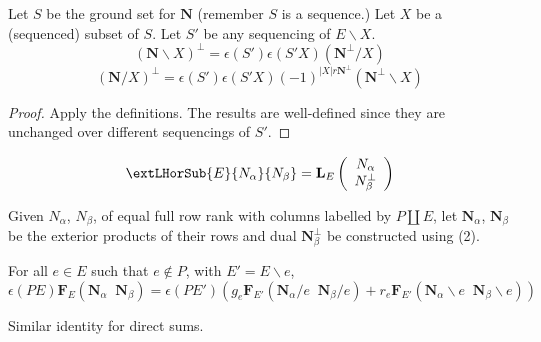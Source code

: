 \documentclass[Unicode]{cedram-alco}
\newcommand{\ext}[1]{\ensuremath{\mathbf{#1}}}
\newcommand{\Nal}{\ensuremath{N_{\alpha}}}
\newcommand{\NbePe}{\ensuremath{N_{\beta}^{\perp}}}
\newcommand{\eNal}{\ensuremath{\ext{N}_{\alpha}}}
\newcommand{\eNbePe}{\ensuremath{\ext{N}_{\beta}^{\perp}}}
\newcommand{\eNbe}{\ensuremath{\ext{N}_\beta}}
\newcommand{\Nbe}{\ensuremath{N_\beta}}
\newcommand{\dunion}{\coprod}
\newcommand{\extLVertSub}[3]{\ext{L}_{#1}\left( \begin{array}{c} {#2}\\ {#3} \end{array} \right)}
\begin{document}
\begin{prop}
  Let $S$ be the ground set for $\ext{N}$ (remember $S$ is a sequence.)
  Let $X$ be a (sequenced) subset of $S$.
  Let $S'$ be any sequencing of $E\backslash X$.
    \begin{equation} (\ext{N}\backslash X)^\perp = \epsilon(S')\epsilon(S'X)(\ext{N}^\perp/X)
    \end{equation}
    \begin{equation} (\ext{N}/X)^\perp = \epsilon(S')\epsilon(S'X)(-1)^{|X|r\ext{N}^\perp}(\ext{N}^\perp\backslash X)
    \end{equation}
\end{prop}
\begin{proof}
  Apply the definitions.  The results are well-defined since they
  are unchanged over different sequencings of $S'$.
\end{proof}

\begin{defi}
  \[
  \extLHorSub{E}{\Nal}{\Nbe}=\extLVertSub{E}{\Nal}{\NbePe}
  \]
\end{defi}

\begin{theo}
  Given $N_\alpha$, $N_\beta$, of equal full row rank with columns labelled by
  $P\dunion E$, let $\eNal$, $\eNbe$ be the exterior products of their rows
  and dual $\eNbePe$ be constructed using (2).


  
  For all $e\in E$ such that $e\not\in P$, with $E'=E\backslash e$,
  {\Large
     \[
     \epsilon(PE)\ext{F}_E(\eNal\;\;\eNbe)=
      \epsilon(PE')
        \left(g_e\ext{F}_{E'}(\eNal/e\;\; \eNbe/e) +
      r_e\ext{F}_{E'}(\eNal\backslash e\;\; \eNbe\backslash e)\right)
      \]
  }

  Similar identity for direct sums.

\end{theo}
  
\end{document}
